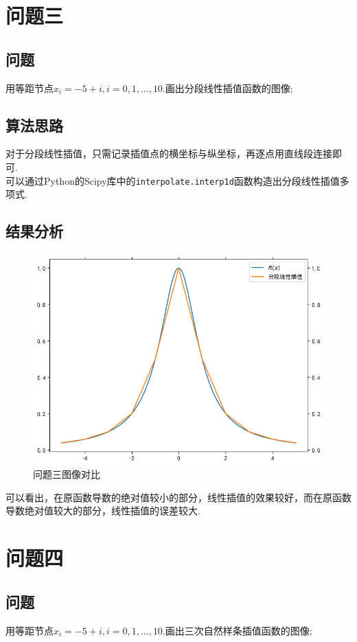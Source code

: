 \documentclass[UTF8,ctexart,a4paper,11pt,openany]{article}
\theoremstyle{definition}
\begin{document}
\section{问题三}
    \subsection[short]{问题}
    用等距节点$x_i=-5+i, i=0,1,...,10.$画出分段线性插值函数的图像;
    \subsection{算法思路}
    对于分段线性插值，只需记录插值点的横坐标与纵坐标，再逐点用直线段连接即可.\\ \indent
    可以通过Python的Scipy库中的\texttt{interpolate.interp1d}函数构造出分段线性插值多项式.
    \subsection{结果分析}%
    \begin{figure}[H]
        \centering
        \includegraphics{pics/P3.3.png}
        \caption{问题三图像对比}
        \label{graph:1}
        \end{figure}
    可以看出，在原函数导数的绝对值较小的部分，线性插值的效果较好，而在原函数导数绝对值较大的部分，线性插值的误差较大.
\section{问题四}
    \subsection{问题}
    用等距节点$x_i=-5+i, i=0,1,...,10.$画出三次自然样条插值函数的图像;
\end{document}
